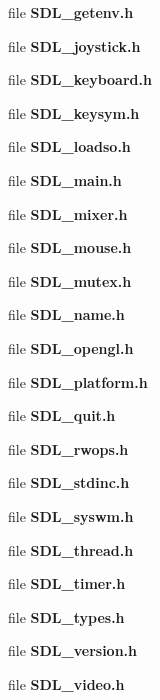 \begin{DoxyCompactItemize}
\item 
file {\bf S\+D\+L\+\_\+getenv.\+h}
\item 
file {\bf S\+D\+L\+\_\+joystick.\+h}
\item 
file {\bf S\+D\+L\+\_\+keyboard.\+h}
\item 
file {\bfseries S\+D\+L\+\_\+keysym.\+h}
\item 
file {\bf S\+D\+L\+\_\+loadso.\+h}
\item 
file {\bf S\+D\+L\+\_\+main.\+h}
\item 
file {\bfseries S\+D\+L\+\_\+mixer.\+h}
\item 
file {\bf S\+D\+L\+\_\+mouse.\+h}
\item 
file {\bf S\+D\+L\+\_\+mutex.\+h}
\item 
file {\bfseries S\+D\+L\+\_\+name.\+h}
\item 
file {\bf S\+D\+L\+\_\+opengl.\+h}
\item 
file {\bf S\+D\+L\+\_\+platform.\+h}
\item 
file {\bf S\+D\+L\+\_\+quit.\+h}
\item 
file {\bf S\+D\+L\+\_\+rwops.\+h}
\item 
file {\bf S\+D\+L\+\_\+stdinc.\+h}
\item 
file {\bf S\+D\+L\+\_\+syswm.\+h}
\item 
file {\bf S\+D\+L\+\_\+thread.\+h}
\item 
file {\bf S\+D\+L\+\_\+timer.\+h}
\item 
file {\bf S\+D\+L\+\_\+types.\+h}
\item 
file {\bf S\+D\+L\+\_\+version.\+h}
\item 
file {\bf S\+D\+L\+\_\+video.\+h}
\end{DoxyCompactItemize}
